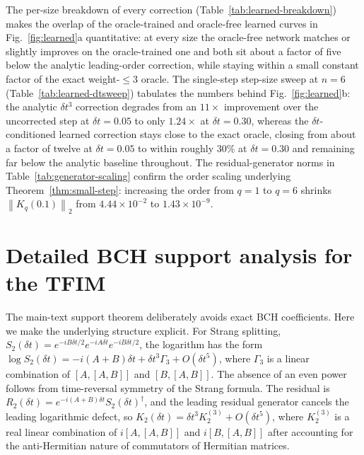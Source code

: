 \documentclass[aps,prxquantum,reprint,superscriptaddress,nofootinbib,amsmath,amssymb]{revtex4-2}
\newcommand{\norm}[1]{\left\lVert #1 \right\rVert}
\newcommand{\dt}{\delta t}
\begin{document}






The per-size breakdown of every correction (Table~\ref{tab:learned-breakdown}) makes the overlap of the oracle-trained and oracle-free learned curves in Fig.~\ref{fig:learned}a quantitative: at every size the oracle-free network matches or slightly improves on the oracle-trained one and both sit about a factor of five below the analytic leading-order correction, while staying within a small constant factor of the exact weight-$\leq3$ oracle. The single-step step-size sweep at $n=6$ (Table~\ref{tab:learned-dtsweep}) tabulates the numbers behind Fig.~\ref{fig:learned}b: the analytic $\dt^3$ correction degrades from an $11\times$ improvement over the uncorrected step at $\dt=0.05$ to only $1.24\times$ at $\dt=0.30$, whereas the $\dt$-conditioned learned correction stays close to the exact oracle, closing from about a factor of twelve at $\dt=0.05$ to within roughly $30\%$ at $\dt=0.30$ and remaining far below the analytic baseline throughout. The residual-generator norms in Table~\ref{tab:generator-scaling} confirm the order scaling underlying Theorem~\ref{thm:small-step}: increasing the order from $q=1$ to $q=6$ shrinks $\norm{K_q(0.1)}_2$ from $4.44\times10^{-2}$ to $1.43\times10^{-9}$.

\section{Detailed BCH support analysis for the TFIM}
\label{app:bch}

The main-text support theorem deliberately avoids exact BCH coefficients. Here we make the underlying structure explicit. For Strang splitting, $S_2(\dt)=e^{-iB\dt/2}e^{-iA\dt}e^{-iB\dt/2}$, the logarithm has the form $\log S_2(\dt)=-i(A+B)\dt+\dt^3\Gamma_3+O(\dt^5)$, where $\Gamma_3$ is a linear combination of $[A,[A,B]]$ and $[B,[A,B]]$. The absence of an even power follows from time-reversal symmetry of the Strang formula. The residual is $R_2(\dt)=e^{-i(A+B)\dt}S_2(\dt)^\dagger$, and the leading residual generator cancels the leading logarithmic defect, so $K_2(\dt)=\dt^3K_2^{(3)}+O(\dt^5)$, where $K_2^{(3)}$ is a real linear combination of $i[A,[A,B]]$ and $i[B,[A,B]]$ after accounting for the anti-Hermitian nature of commutators of Hermitian matrices.
\end{document}
